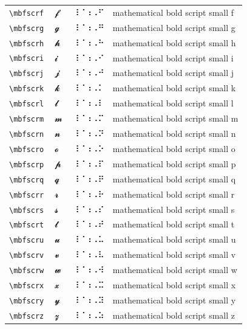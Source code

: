 \documentclass[oneside]{article}
\begin{document}
\begin{longtable}{llll}
\verb|\mbfscrf| & $\mbfscrf$ &  ⠸⠈⠰⠠⠋  & {mathematical bold script small f} \\[2ex]
\verb|\mbfscrg| & $\mbfscrg$ &  ⠸⠈⠰⠠⠛  & {mathematical bold script small g} \\[2ex]
\verb|\mbfscrh| & $\mbfscrh$ &  ⠸⠈⠰⠠⠓  & {mathematical bold script small h} \\[2ex]
\verb|\mbfscri| & $\mbfscri$ &  ⠸⠈⠰⠠⠊  & {mathematical bold script small i} \\[2ex]
\verb|\mbfscrj| & $\mbfscrj$ &  ⠸⠈⠰⠠⠚  & {mathematical bold script small j} \\[2ex]
\verb|\mbfscrk| & $\mbfscrk$ &  ⠸⠈⠰⠠⠅  & {mathematical bold script small k} \\[2ex]
\verb|\mbfscrl| & $\mbfscrl$ &  ⠸⠈⠰⠠⠇  & {mathematical bold script small l} \\[2ex]
\verb|\mbfscrm| & $\mbfscrm$ &  ⠸⠈⠰⠠⠍  & {mathematical bold script small m} \\[2ex]
\verb|\mbfscrn| & $\mbfscrn$ &  ⠸⠈⠰⠠⠝  & {mathematical bold script small n} \\[2ex]
\verb|\mbfscro| & $\mbfscro$ &  ⠸⠈⠰⠠⠕  & {mathematical bold script small o} \\[2ex]
\verb|\mbfscrp| & $\mbfscrp$ &  ⠸⠈⠰⠠⠏  & {mathematical bold script small p} \\[2ex]
\verb|\mbfscrq| & $\mbfscrq$ &  ⠸⠈⠰⠠⠟  & {mathematical bold script small q} \\[2ex]
\verb|\mbfscrr| & $\mbfscrr$ &  ⠸⠈⠰⠠⠗  & {mathematical bold script small r} \\[2ex]
\verb|\mbfscrs| & $\mbfscrs$ &  ⠸⠈⠰⠠⠎  & {mathematical bold script small s} \\[2ex]
\verb|\mbfscrt| & $\mbfscrt$ &  ⠸⠈⠰⠠⠞  & {mathematical bold script small t} \\[2ex]
\verb|\mbfscru| & $\mbfscru$ &  ⠸⠈⠰⠠⠥  & {mathematical bold script small u} \\[2ex]
\verb|\mbfscrv| & $\mbfscrv$ &  ⠸⠈⠰⠠⠧  & {mathematical bold script small v} \\[2ex]
\verb|\mbfscrw| & $\mbfscrw$ &  ⠸⠈⠰⠠⠺  & {mathematical bold script small w} \\[2ex]
\verb|\mbfscrx| & $\mbfscrx$ &  ⠸⠈⠰⠠⠭  & {mathematical bold script small x} \\[2ex]
\verb|\mbfscry| & $\mbfscry$ &  ⠸⠈⠰⠠⠽  & {mathematical bold script small y} \\[2ex]
\verb|\mbfscrz| & $\mbfscrz$ &  ⠸⠈⠰⠠⠵  & {mathematical bold script small z} \\[2ex]

\end{longtable}
\end{document}

